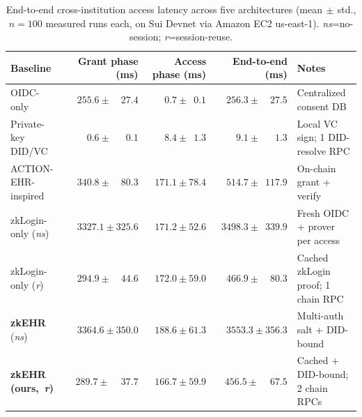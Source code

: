 \begin{table}[!t]
\caption{End-to-end cross-institution access latency across five
architectures (mean$\,\pm\,$std., $n{=}100$ measured runs each, on Sui
Devnet via Amazon EC2 us-east-1). \textit{ns}=no-session;
\textit{r}=session-reuse.}
\label{tab:e2e-cross-institution-latency}
\centering
\renewcommand{\arraystretch}{1.25}
\begin{tabular}{l rrr l}
\toprule
\textbf{Baseline} & \textbf{Grant phase (ms)} & \textbf{Access phase (ms)} & \textbf{End-to-end (ms)} & \textbf{Notes} \\
\midrule
OIDC-only                       & $\phantom{0}255.6 \pm \phantom{00}27.4$ & $\phantom{000}0.7 \pm \phantom{0}0.1$  & $\phantom{0}256.3 \pm \phantom{00}27.5$ & Centralized consent DB \\
Private-key DID/VC              & $\phantom{0000}0.6 \pm \phantom{000}0.1$ & $\phantom{000}8.4 \pm \phantom{0}1.3$  & $\phantom{0000}9.1 \pm \phantom{000}1.3$  & Local VC sign; 1 DID-resolve RPC \\
ACTION-EHR-inspired             & $\phantom{0}340.8 \pm \phantom{00}80.3$ & $\phantom{0}171.1 \pm 78.4$ & $\phantom{0}514.7 \pm \phantom{0}117.9$ & On-chain grant + verify \\
zkLogin-only (\textit{ns})      & $3327.1 \pm 325.6$ & $\phantom{0}171.2 \pm 52.6$ & $3498.3 \pm \phantom{0}339.9$ & Fresh OIDC + prover per access \\
zkLogin-only (\textit{r})       & $\phantom{0}294.9 \pm \phantom{00}44.6$ & $\phantom{0}172.0 \pm 59.0$ & $\phantom{0}466.9 \pm \phantom{00}80.3$ & Cached zkLogin proof; 1 chain RPC \\
\textbf{zkEHR} (\textit{ns})    & $\mathbf{3364.6 \pm 350.0}$            & $\mathbf{188.6 \pm 61.3}$ & $\mathbf{3553.3 \pm 356.3}$ & Multi-auth salt + DID-bound \\
\textbf{zkEHR (ours,~\textit{r})} & $\mathbf{289.7 \pm \phantom{00}37.7}$ & $\mathbf{166.7 \pm 59.9}$ & $\mathbf{456.5 \pm \phantom{00}67.5}$ & Cached + DID-bound; 2 chain RPCs \\
\bottomrule
\end{tabular}
\end{table}

